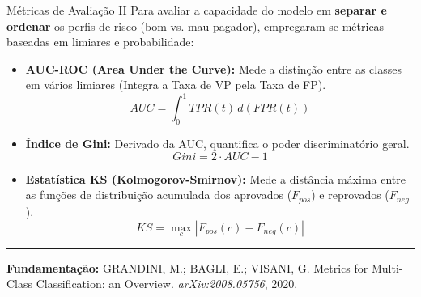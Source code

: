 \documentclass[aspectratio=169]{beamer}
\begin{document}
\begin{frame}{Métricas de Avaliação II}
    Para avaliar a capacidade do modelo em \textbf{separar e ordenar} os perfis de risco (bom vs. mau pagador), empregaram-se métricas baseadas em limiares e probabilidade:
    
    \vspace{0.2cm}
    \begin{itemize}
        \item \textbf{AUC-ROC (Area Under the Curve):} Mede a distinção entre as classes em vários limiares (Integra a Taxa de VP pela Taxa de FP).
        $$ AUC = \int_{0}^{1} TPR(t) \, d(FPR(t)) $$
        
        \item \textbf{Índice de Gini:} Derivado da AUC, quantifica o poder discriminatório geral.
        $$ Gini = 2 \cdot AUC - 1 $$
        
        \item \textbf{Estatística KS (Kolmogorov-Smirnov):} Mede a distância máxima entre as funções de distribuição acumulada dos aprovados ($F_{pos}$) e reprovados ($F_{neg}$).
        $$ KS = \max_{c} |F_{pos}(c) - F_{neg}(c)| $$
    \end{itemize}
    
    \vfill
    \hrule
    \vspace{0.1cm}
    {\tiny \textbf{Fundamentação:} GRANDINI, M.; BAGLI, E.; VISANI, G. Metrics for Multi-Class Classification: an Overview. \textit{arXiv:2008.05756}, 2020.}
\end{frame}
\end{document}
